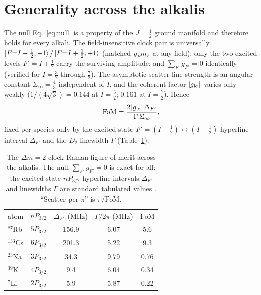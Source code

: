 \documentclass[aps,pra,reprint,amsmath,amssymb,superscriptaddress,floatfix]{revtex4-2}
\newcommand{\Dm}{\Delta m}
\newcommand{\FoM}{\mathrm{FoM}}
\begin{document}
\section{Generality across the alkalis}\label{sec:generality}
The null Eq.~\eqref{eq:null} is a property of the $J=\tfrac12$ ground manifold and therefore holds
for every alkali. The field-insensitive clock pair is universally
$\ket{F{=}I-\tfrac12,-1}/\ket{F{=}I+\tfrac12,+1}$ (matched $g_F m_F$ at any field); only the two
excited levels $F'=I\mp\tfrac12$ carry the surviving amplitude; and $\sum_{F'}g_{F'}=0$ identically
(verified for $I=\tfrac32$ through $\tfrac72$). The asymptotic scatter line strength is an angular
constant $\Sigma_\infty=\tfrac43$ independent of $I$, and the coherent factor $|g_{\rm lo}|$ varies
only weakly ($1/(4\sqrt3)=0.144$ at $I=\tfrac32$; $0.161$ at $I=\tfrac72$). Hence
\begin{equation}
\FoM=\frac{2|g_{\rm lo}|\,\Delta_{F'}}{\Gamma\,\Sigma_\infty},
\end{equation}
fixed per species only by the excited-state $F'{=}(I{-}\tfrac12)\!\leftrightarrow\!(I{+}\tfrac12)$
hyperfine interval $\Delta_{F'}$ and the $D_2$ linewidth $\Gamma$
(Table~\ref{tab:generality}).

\begin{table}[t]
\caption{\label{tab:generality} The $\Dm=2$ clock-Raman figure of merit across the alkalis. The
null $\sum_{F'}g_{F'}=0$ is exact for all; the excited-state $nP_{3/2}$ hyperfine intervals
$\Delta_{F'}$ and linewidths $\Gamma$ are standard tabulated values
\cite{steck_rb,steck_cs,steck_na,tiecke_k,gehm_li}. ``Scatter per $\pi$'' is $\pi/\FoM$.}
\begin{ruledtabular}
\begin{tabular}{lcccc}
atom & $nP_{3/2}$ & $\Delta_{F'}$ (MHz) & $\Gamma/2\pi$ (MHz) & $\FoM$ \\
\colrule
$^{87}$Rb  & $5P_{3/2}$ & 156.9 & 6.07 & 5.6 \\
$^{133}$Cs & $6P_{3/2}$ & 201.3 & 5.22 & 9.3 \\
$^{23}$Na  & $3P_{3/2}$ & 34.3  & 9.79 & 0.76 \\
$^{39}$K   & $4P_{3/2}$ & 9.4   & 6.04 & 0.34 \\
$^{7}$Li   & $2P_{3/2}$ & 5.9   & 5.87 & 0.22 \\
\end{tabular}
\end{ruledtabular}
\end{table}
\end{document}
